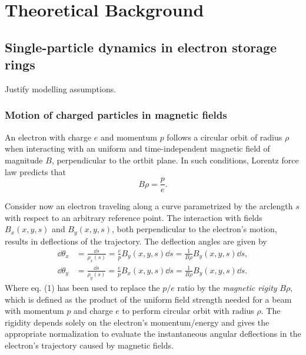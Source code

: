 \chapter{Theoretical Background}

\section{Single-particle dynamics in electron storage rings}
Justify modelling assumptions.

\subsection{Motion of charged particles in magnetic fields}
An electron with charge $e$ and momentum $p$ follows a circular orbit of radius $\rho$ when interacting with an uniform and time-independent magnetic field of magnitude $B$, perpendicular to the ortbit plane. In such conditions, Lorentz force law predicts that
\begin{equation}
    B\rho = \frac{p}{e}.
    \label{eq:rigidity}
\end{equation}

Consider now an electron traveling along a curve parametrized by the arclength $s$ with respect to an arbitrary reference point. The interaction with fields $B_x(x,y,s)$  and $B_y(x,y,s)$, both perpendicular to the electron's motion, results in deflections of the trajectory. The deflection angles are given by
    \begin{equation}
        \begin{aligned}
            \dd{\theta_x} & = \frac{\dd{s}}{\rho_x(s)} = \frac{e}{p}B_y(x,y,s)\dd s = \frac{1}{B\rho}B_y(x,y,s)\dd s,\\
            \dd{\theta_y} & = \frac{\dd{s}}{\rho_y(s)} = \frac{e}{p}B_x(x,y,s)\dd s = \frac{1}{B\rho}B_y(x,y,s)\dd s.
        \end{aligned}
        \label{eq:deflec_angles}
    \end{equation}
Where eq. (1) has been used to replace the $p/e$ ratio by the \textit{magnetic rigity} $B\rho$, which is defined as the product of the uniform field strength needed for a beam with momentum $p$ and charge $e$ to perform circular orbit with radius $\rho$. The rigidity depends solely on the electron's momentum/energy and gives the appropriate normalization to evaluate the instantaneous angular deflections in the electron's trajectory caused by magnetic fields.


